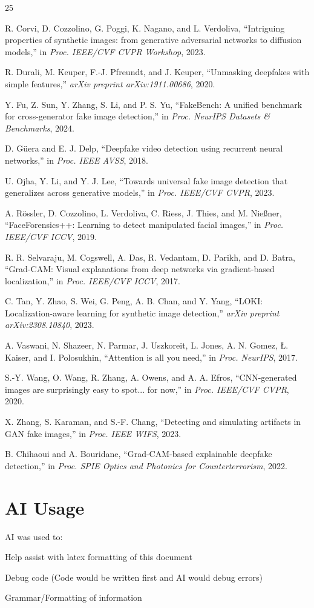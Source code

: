 \documentclass{article}
\begin{document}
\begin{thebibliography}{25}

R. Corvi, D. Cozzolino, G. Poggi, K. Nagano, and L. Verdoliva,
``Intriguing properties of synthetic images: from generative adversarial networks to diffusion models,''
in \textit{Proc. IEEE/CVF CVPR Workshop}, 2023.

R. Durali, M. Keuper, F.-J. Pfreundt, and J. Keuper,
``Unmasking deepfakes with simple features,''
\textit{arXiv preprint arXiv:1911.00686}, 2020.

Y. Fu, Z. Sun, Y. Zhang, S. Li, and P. S. Yu,
``FakeBench: A unified benchmark for cross-generator fake image detection,''
in \textit{Proc. NeurIPS Datasets \& Benchmarks}, 2024.

D. G\"{u}era and E. J. Delp,
``Deepfake video detection using recurrent neural networks,''
in \textit{Proc. IEEE AVSS}, 2018.

U. Ojha, Y. Li, and Y. J. Lee,
``Towards universal fake image detection that generalizes across generative models,''
in \textit{Proc. IEEE/CVF CVPR}, 2023.

A. R\"{o}ssler, D. Cozzolino, L. Verdoliva, C. Riess, J. Thies, and M. Nie{\ss}ner,
``FaceForensics++: Learning to detect manipulated facial images,''
in \textit{Proc. IEEE/CVF ICCV}, 2019.

R. R. Selvaraju, M. Cogswell, A. Das, R. Vedantam, D. Parikh, and D. Batra,
``Grad-CAM: Visual explanations from deep networks via gradient-based localization,''
in \textit{Proc. IEEE/CVF ICCV}, 2017.

C. Tan, Y. Zhao, S. Wei, G. Peng, A. B. Chan, and Y. Yang,
``LOKI: Localization-aware learning for synthetic image detection,''
\textit{arXiv preprint arXiv:2308.10840}, 2023.

A. Vaswani, N. Shazeer, N. Parmar, J. Uszkoreit, L. Jones, A. N. Gomez, {\L}. Kaiser, and I. Polosukhin,
``Attention is all you need,''
in \textit{Proc. NeurIPS}, 2017.

S.-Y. Wang, O. Wang, R. Zhang, A. Owens, and A. A. Efros,
``CNN-generated images are surprisingly easy to spot... for now,''
in \textit{Proc. IEEE/CVF CVPR}, 2020.

X. Zhang, S. Karaman, and S.-F. Chang,
``Detecting and simulating artifacts in GAN fake images,''
in \textit{Proc. IEEE WIFS}, 2023.

B. Chihaoui and A. Bouridane,
``Grad-CAM-based explainable deepfake detection,''
in \textit{Proc. SPIE Optics and Photonics for Counterterrorism}, 2022.

\end{thebibliography}

\appendix
\section{AI Usage}
AI was used to:

Help assist with latex formatting of this document

Debug code (Code would be written first and AI would debug errors)

Grammar/Formatting of information
\end{document}
